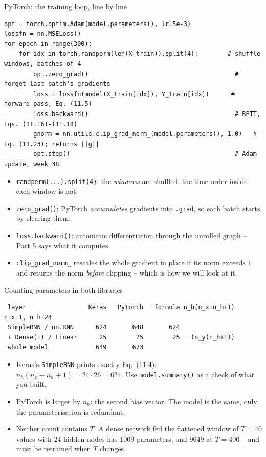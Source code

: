 \documentclass[10pt,aspectratio=169]{beamer}
\begin{document}
\begin{frame}[fragile]{PyTorch: the training loop, line by line}
\begin{lstlisting}
opt = torch.optim.Adam(model.parameters(), lr=5e-3)
lossfn = nn.MSELoss()
for epoch in range(300):
    for idx in torch.randperm(len(X_train)).split(4):        # shuffle windows, batches of 4
        opt.zero_grad()                                        # forget last batch's gradients
        loss = lossfn(model(X_train[idx]), Y_train[idx])      # forward pass, Eq. (11.5)
        loss.backward()                                        # BPTT, Eqs. (11.16)-(11.18)
        gnorm = nn.utils.clip_grad_norm_(model.parameters(), 1.0)   # Eq. (11.23); returns ||g||
        opt.step()                                             # Adam update, week 38
\end{lstlisting}
\small
\begin{itemize}
  \item \texttt{randperm(...).split(4)}: the \emph{windows} are shuffled,
        the time order inside each window is not.
  \item \texttt{zero\_grad()}: PyTorch \emph{accumulates} gradients into
        \texttt{.grad}, so each batch starts by clearing them.
  \item \texttt{loss.backward()}: automatic differentiation through the
        unrolled graph -- Part 5 says what it computes.
  \item \texttt{clip\_grad\_norm\_} rescales the whole gradient in place if
        its norm exceeds $1$ and returns the norm \emph{before} clipping --
        which is how we will look at it.
\end{itemize}
\end{frame}

\begin{frame}[fragile]{Counting parameters in both libraries}
\begin{lstlisting}
 layer                 Keras   PyTorch   formula n_h(n_x+n_h+1)      n_x=1, n_h=24
 SimpleRNN / nn.RNN      624       648       624
 + Dense(1) / Linear      25        25        25   (n_y(n_h+1))
 whole model             649       673
\end{lstlisting}
\small
\begin{itemize}
  \item Keras's \texttt{SimpleRNN} prints exactly Eq.~(11.4):
        $n_h(n_x+n_h+1)=24\cdot26=624$.  Use \texttt{model.summary()} as a
        check of what you built.
  \item PyTorch is larger by $n_h$: the second bias vector.  The model is
        the same, only the parameterisation is redundant.
  \item Neither count contains $T$.  A dense network fed the flattened
        window of $T=40$ values with $24$ hidden nodes has $1009$ parameters,
        and $9649$ at $T=400$ -- and must be retrained when $T$ changes.
\end{itemize}
\end{frame}
\end{document}
